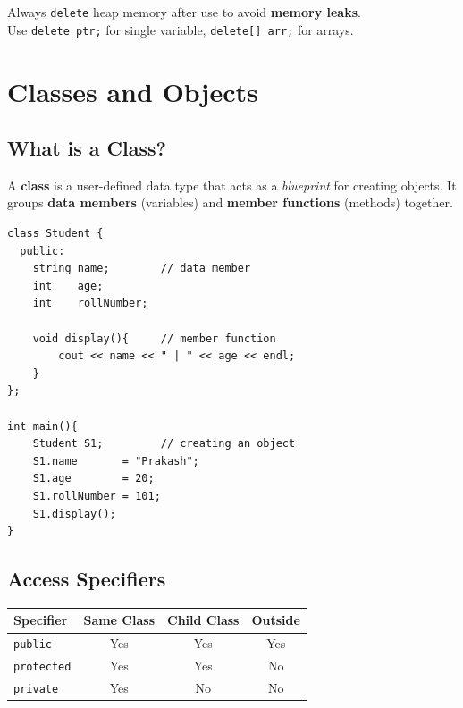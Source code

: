 \documentclass[12pt,a4paper]{report}
\begin{document}
\begin{warnbox}
Always \texttt{delete} heap memory after use to avoid \textbf{memory leaks}.\\
Use \texttt{delete ptr;} for single variable, \texttt{delete[] arr;} for arrays.
\end{warnbox}

\chapter{Classes and Objects}

\section{What is a Class?}

A \textbf{class} is a user-defined data type that acts as a \textit{blueprint} for creating objects.
It groups \textbf{data members} (variables) and \textbf{member functions} (methods) together.

\begin{lstlisting}[caption={Basic Class and Object}]
class Student {
  public:
    string name;        // data member
    int    age;
    int    rollNumber;

    void display(){     // member function
        cout << name << " | " << age << endl;
    }
};

int main(){
    Student S1;         // creating an object
    S1.name       = "Prakash";
    S1.age        = 20;
    S1.rollNumber = 101;
    S1.display();
}
\end{lstlisting}

\section{Access Specifiers}

\begin{center}
\begin{tabular}{|l|c|c|c|}
\hline
\textbf{Specifier} & \textbf{Same Class} & \textbf{Child Class} & \textbf{Outside} \\
\hline
\texttt{public}    & Yes & Yes & Yes \\
\texttt{protected} & Yes & Yes & No  \\
\texttt{private}   & Yes & No  & No  \\
\hline
\end{tabular}
\end{center}
\end{document}
